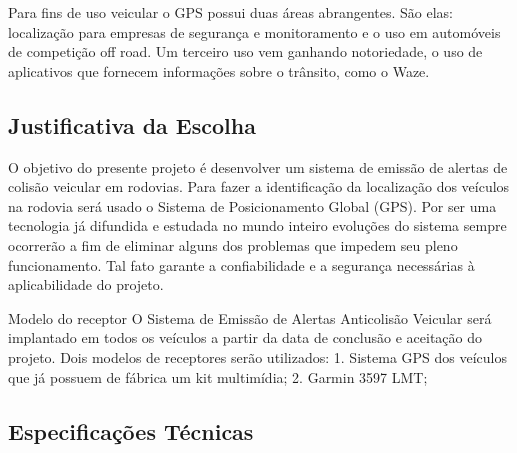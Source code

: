 Para fins de uso veicular o GPS possui duas áreas abrangentes. São elas: localização para empresas de segurança e monitoramento e o uso em automóveis de competição off road. Um terceiro uso vem ganhando notoriedade, o uso de aplicativos que fornecem informações sobre o trânsito, como o Waze.

\subsection{Justificativa da Escolha}

	O objetivo do presente projeto é desenvolver um sistema de emissão de alertas de colisão veicular em rodovias. Para fazer a identificação da localização dos veículos na rodovia será usado o Sistema de Posicionamento Global (GPS). Por ser uma tecnologia já difundida e estudada no mundo inteiro evoluções do sistema sempre ocorrerão a fim de eliminar alguns dos problemas que impedem seu pleno funcionamento. Tal fato garante a confiabilidade e a segurança necessárias à aplicabilidade do projeto.

Modelo do receptor
	O Sistema de Emissão de Alertas Anticolisão Veicular será implantado em todos os veículos a partir da data de conclusão e aceitação do projeto. Dois modelos de receptores serão utilizados:
1. Sistema GPS dos veículos que já possuem de fábrica um kit multimídia;
2. Garmin 3597 LMT;

\subsection{Especificações Técnicas}


